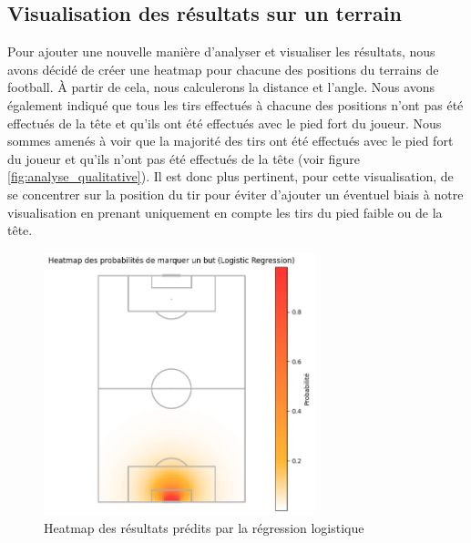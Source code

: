 \documentclass[12pt]{article}
\begin{document}
\newpage

\subsection{Visualisation des résultats sur un terrain}
Pour ajouter une nouvelle manière d'analyser et visualiser les résultats, nous avons décidé de créer une heatmap pour chacune des positions du terrains de football.
À partir de cela, nous calculerons la distance et l'angle. 
Nous avons également indiqué que tous les tirs effectués à chacune des positions n'ont pas été effectués de la tête et qu'ils ont été effectués avec le pied fort du joueur.
Nous sommes amenés à voir que la majorité des tirs ont été effectués avec le pied fort du joueur et qu'ils n'ont pas été effectués de la tête (voir figure \ref{fig:analyse_qualitative}).
Il est donc plus pertinent, pour cette visualisation, de se concentrer sur la position du tir pour éviter d'ajouter un éventuel biais à notre visualisation en prenant uniquement en compte les tirs du pied faible ou de la tête.

\begin{figure}[htp]
    \centering
    \includegraphics[width=0.7\textwidth]{img/pitch_visualisation_log_reg.png}
    \caption{Heatmap des résultats prédits par la régression logistique}
    \label{fig:result_log_reg}
\end{figure}
\end{document}
